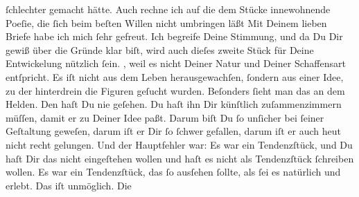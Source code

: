 \begin{ledgroupsized}[t]{13cm}
               ſchlechter gemacht hätte. {\pb}Auch rechne ich auf die
               dem Stücke innewohnende
               Poeſie, die ſich beim beſten Willen nicht umbringen läßt{\dotsfive}\pend
           \pstart
           Mit Deinem lieben Briefe habe ich mich ſehr gefreut. Ich begreife Deine Stimmung, und
               da Du Dir gewiß über die Gründe klar biſt, wird auch dieſes zweite Stück für Deine Entwickelung nützlich ſein.
                  \label{K_L02790-3v}\label{K_L02790-3h}, weil es nicht Deiner Natur und Deiner Schaffensart entſpricht. Es iſt nicht
               aus dem Leben herausgewachſen, ſondern aus einer Idee, zu der hinterdrein die Figuren
               geſucht wurden. Beſonders {\pb}ſieht man das an dem Helden. Den haſt Du nie
               geſehen. Du haſt ihn Dir künſtlich zuſammenzimmern müſſen, damit er zu Deiner Idee
               paßt. Darum biſt Du ſo unſicher bei ſeiner Geſtaltung geweſen, darum iſt er Dir ſo
               ſchwer gefallen, darum iſt er auch heut nicht recht gelungen. Und der Hauptfehler
               war: Es war ein Tendenzſtück, und Du haſt Dir das nicht eingeſtehen wollen und haſt
               es nicht als Tendenzſtück ſchreiben wollen. Es war ein Tendenzſtück, das ſo ausſehen
               ſollte, als ſei es natürlich {\pb}und erlebt. Das iſt
               unmöglich. Die \label{K_L02790-777v}\label{K_L02790-777h}

\end{ledgroupsized}
